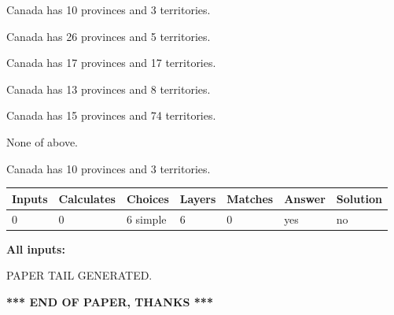 \documentclass[12pt]{article}
\begin{document}
 
Canada has 10  provinces and 3 territories.
 
 
Canada has  26 provinces and  5 territories.
 
 
Canada has  17 provinces and  17 territories.
 
 
Canada has  13 provinces and  8 territories.
 
 
Canada has  15 provinces and  74 territories.
 
 
 None of above.
 
 
\noindent{}
 
 
Canada has 10  provinces and 3 territories.
 
 
\noindent{}
 
 
   
   
   
   
\noindent\begin{tabular}{|l|l|l|l|l|l|l|}
 \hline
Inputs & Calculates & Choices & Layers & Matches & Answer & Solution \\ \hline
 0  & 
 0  & 
 6
  simple  
  & 
 6  & 
 0  & 
  yes & 
  no 
  \\ \hline
 \end{tabular}
   
   
   
   
\noindent{}
   
   
   
   
\noindent\vspace{0.1in}\hspace{-0.08in} {\textbf{\Large{All inputs: }}}
   
   
   
   
   
   
 \vspace{0.2in}
 
   
   
\vspace{2.0in} PAPER TAIL GENERATED.
   
   
   
   
\vspace{1.0in} 
{\textbf{\large{ *** END OF PAPER, THANKS *** }}} 
   
\end{document}
